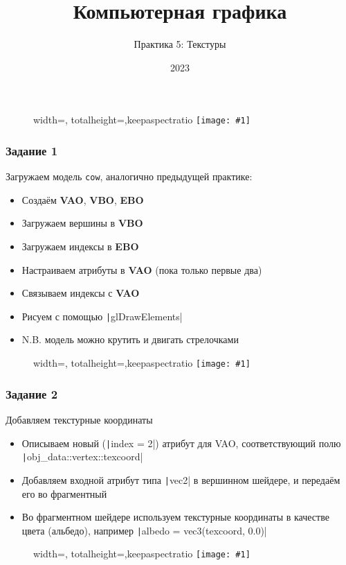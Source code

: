 \documentclass[10pt]{beamer}
\title{Компьютерная графика}
\subtitle{Практика 5: Текстуры}
\date{2023}
\newcommand{\slideimage}[1]{
  \begin{figure}
    \begin{adjustbox}{width=\textwidth, totalheight=\textheight-2\baselineskip-2\baselineskip,keepaspectratio}
      \texttt{[image: \#1]}
    \end{adjustbox}
  \end{figure}
}
\begin{document}
\frame{\titlepage}

\begin{frame}[fragile]
\slideimage{0.png}
\end{frame}


\begin{frame}[fragile]
\frametitle{Задание 1}
Загружаем модель \verb|cow|, аналогично предыдущей практике:
\begin{itemize}
\item Создаём \textbf{VAO}, \textbf{VBO}, \textbf{EBO}
\item Загружаем вершины в \textbf{VBO}
\item Загружаем индексы в \textbf{EBO}
\item Настраиваем атрибуты в \textbf{VAO} (пока только первые два)
\item Связываем индексы с \textbf{VAO}
\item Рисуем с помощью \texttt|glDrawElements|
\item N.B. модель можно крутить и двигать стрелочками
\end{itemize}
\end{frame}

\begin{frame}[fragile]
\slideimage{1.png}
\end{frame}

\begin{frame}[fragile]
\frametitle{Задание 2}
Добавляем текстурные координаты
\begin{itemize}
\item Описываем новый (\texttt|index = 2|) атрибут для VAO, соответствующий полю \texttt|obj_data::vertex::texcoord|
\item Добавляем входной атрибут типа \texttt|vec2| в вершинном шейдере, и передаём его во фрагментный
\item Во фрагментном шейдере используем текстурные координаты в качестве цвета (альбедо), например \texttt|albedo = vec3(texcoord, 0.0)|
\end{itemize}
\end{frame}

\begin{frame}[fragile]
\slideimage{2.png}
\end{frame}
\end{document}
